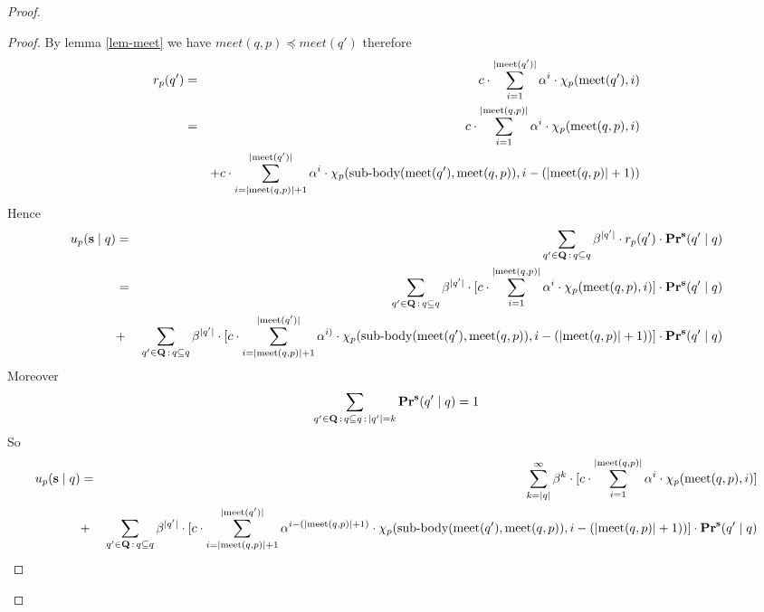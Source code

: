 \begin{proof}
\begin{proof}
	By lemma \ref{lem-meet} we have $meet(q,p) \preceq meet(q')$ therefore
	\begin{eqnarray*}
		r_p(q') & = &{\displaystyle c \cdot \sum_{i=1}^{|\text{\rm meet}(q')|} \alpha^i \cdot \chi_p(\text{\rm meet}(q'),i)} \\
		& = & {\displaystyle c \cdot \sum_{i=1}^{|\text{\rm meet}(q,p)|} \alpha^i \cdot \chi_p(\text{\rm meet}(q,p),i) } \\
		&&	+ {\displaystyle c \cdot \sum_{i=|\text{\rm meet}(q,p)|+1}^{|\text{\rm meet}(q')|} \alpha^{i} \cdot \chi_p({\text{\rm sub-body}}(\text{\rm meet}(q'),\text{\rm meet}(q,p)),i-(|\text{\rm meet}(q,p)|+1))  }   \\
	\end{eqnarray*}
Hence 
	\begin{eqnarray*}
		u_p(\mathbf{s} \mid q)& = & \sum_{q' \in \mathbf{Q} \,:\, q \subseteq q} \beta^{|q'|} \cdot  r_p(q') \cdot \mathbf{Pr}^{\mathbf{s}}(q' \mid q) \\ 
		& = & \sum_{q' \in \mathbf{Q} \,:\, q \subseteq q} \beta^{|q'|} \cdot  [{\displaystyle c \cdot \sum_{i=1}^{|\text{\rm meet}(q,p)|} \alpha^i \cdot \chi_p(\text{\rm meet}(q,p),i) }] \cdot \mathbf{Pr}^{\mathbf{s}}(q' \mid q) \\
		&+ & \sum_{q' \in \mathbf{Q} \,:\, q \subseteq q} \beta^{|q'|} \cdot  [{\displaystyle c \cdot \sum_{i=|\text{\rm meet}(q,p)|+1}^{|\text{\rm meet}(q')|} \alpha^{i)} \cdot \chi_p({\text{\rm sub-body}}(\text{\rm meet}(q'),\text{\rm meet}(q,p)),i-(|\text{\rm meet}(q,p)|+1))  }] \cdot \mathbf{Pr}^{\mathbf{s}}(q' \mid q) \\
	\end{eqnarray*}
Moreover $$ \sum_{q' \in \mathbf{Q} \,:\, q \subseteq q \,:\, |q'| =k}  \mathbf{Pr}^{\mathbf{s}}(q' \mid q) = 1$$
So 
	\begin{eqnarray*}
		u_p(\mathbf{s} \mid q) & = & \sum_{k = |q|}^{\infty} \beta^{k} \cdot  [{\displaystyle c \cdot \sum_{i=1}^{|\text{\rm meet}(q,p)|} \alpha^i \cdot \chi_p(\text{\rm meet}(q,p),i) }] \\
		&+ & \sum_{q' \in \mathbf{Q} \,:\, q \subseteq q} \beta^{|q'|} \cdot  [{\displaystyle c \cdot \sum_{i=|\text{\rm meet}(q,p)|+1}^{|\text{\rm meet}(q')|} \alpha^{i-(|\text{\rm meet}(q,p)|+1)} \cdot \chi_p({\text{\rm sub-body}}(\text{\rm meet}(q'),\text{\rm meet}(q,p)),i-(|\text{\rm meet}(q,p)|+1))  }] \cdot \mathbf{Pr}^{\mathbf{s}}(q' \mid q) \\
	\end{eqnarray*}


\end{proof}
\end{proof}
